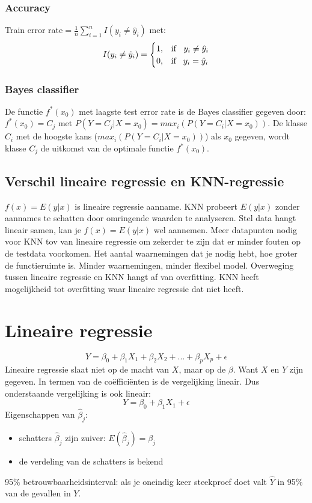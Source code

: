 {\subsubsection{Accuracy}
Train error rate$=\frac{1}{n}\sum\limits_{i=1}^nI(y_i\neq\hat{y}_i)$
met:
\[I(y_i\neq\hat{y}_i)=\begin{cases}
    1, & \text{if }\hspace{2mm} y_i\neq\hat{y}_i\\
    0, & \text{if}\hspace{3mm} y_i=\hat{y}_i
\end{cases}\]

\subsubsection{Bayes classifier}
De functie $f^*(x_0)$ met laagste test error rate is de Bayes classifier gegeven door:
$f^*(x_0)=C_j$ met $P(Y=C_j|X=x_0)=max_i(P(Y=C_i|X=x_0))$. De klasse $C_i$ met de hoogste kans ($max_i(P(Y=C_i|X=x_0))$) als $x_0$ gegeven, wordt klasse $C_j$ de uitkomst van de optimale functie $f^*(x_0)$.\\

\subsection{Verschil lineaire regressie en KNN-regressie}
\noindent $f(x)=E(y|x)$ is lineaire regressie aanname. KNN probeert $E(y|x)$ zonder aannames te schatten door omringende waarden te analyseren. Stel data hangt lineair samen, kan je $f(x)=E(y|x)$ wel aannemen. Meer datapunten nodig voor KNN tov van lineaire regressie om zekerder te zijn dat er minder fouten op de testdata voorkomen. Het aantal waarnemingen dat je nodig hebt, hoe groter de functieruimte is. Minder waarnemingen, minder flexibel model. Overweging tussen lineaire regressie en KNN hangt af van overfitting. KNN heeft mogelijkheid tot overfitting waar lineaire regressie dat niet heeft.\\

\section{Lineaire regressie}
\[Y=\beta_0+\beta_1X_1+\beta_2X_2+...+\beta_pX_p+\epsilon\]
Lineaire regressie slaat niet op de macht van $X$, maar op de $\beta$. Want $X$ en $Y$ zijn gegeven. In termen van de coëfficiënten is de vergelijking lineair. Dus onderstaande vergelijking is ook lineair:
\[Y=\beta_0+\beta_1X_1+\epsilon\]
\noindent Eigenschappen van $\hat{\beta}_j$:
\begin{itemize}
    \item schatters $\hat{\beta}_j$ zijn zuiver: $E(\hat{\beta}_j)=\beta_j$
    \item de verdeling van de schatters is bekend
\end{itemize}
95\% betrouwbaarheidsinterval: als je oneindig keer steekproef doet valt $\hat{Y}$ in 95\% van de gevallen in $Y$.\\
\begin{multicols}{2}


\end{multicols}}
